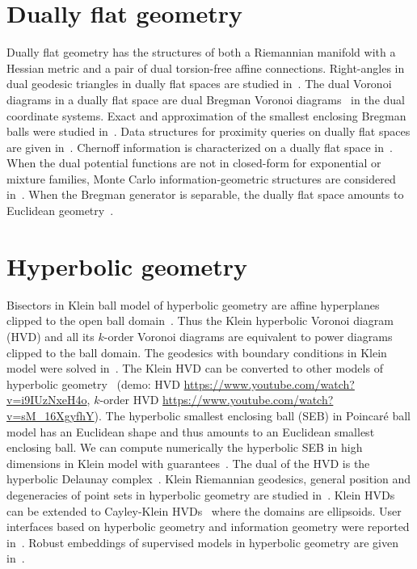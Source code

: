 \documentclass[11pt]{article}
\begin{document}
\section*{Dually flat geometry}

Dually flat geometry has the structures of both a Riemannian manifold with a Hessian metric and a pair of dual torsion-free affine connections.
Right-angles in dual geodesic triangles in dually flat spaces are studied in~\cite{nielsen2021geodesic}.
The dual Voronoi diagrams in a dually flat space are dual Bregman Voronoi diagrams~\cite{boissonnat2010bregman} in the dual coordinate systems.
Exact and approximation of the smallest enclosing Bregman balls were studied in~\cite{nock2005fitting,nielsen2008smallest}.
Data structures for proximity queries on dually flat spaces are given in~\cite{nielsen2009tailored,nielsen2009bregman}.
Chernoff information is characterized on a dually flat space in~\cite{nielsen2013information,nielsen2013hypothesis}.
When the dual potential functions are not in closed-form for exponential or mixture families, Monte Carlo information-geometric structures are considered in~\cite{nielsen2019monte}.
When the Bregman generator is separable, the dually flat space amounts to Euclidean geometry~\cite{gomes2018geometry}.





\section*{Hyperbolic geometry}
Bisectors in Klein ball model of hyperbolic geometry are affine hyperplanes clipped to the open ball domain~\cite{nielsen2010hyperbolic}.
Thus the Klein hyperbolic Voronoi diagram (HVD) and all its $k$-order Voronoi diagrams are equivalent to  power diagrams clipped to the ball domain.
The geodesics with boundary conditions in Klein model were solved in~\cite{nielsen2012hyperbolic}.
The Klein HVD can be converted to other models of hyperbolic geometry~\cite{nielsen2014visualizing} (demo: HVD \url{https://www.youtube.com/watch?v=i9IUzNxeH4o}, $k$-order HVD \url{https://www.youtube.com/watch?v=sM_16XgyfhY}). 
The hyperbolic smallest enclosing  ball (SEB) in Poincar\'e ball model has an Euclidean shape and thus amounts to an Euclidean smallest enclosing ball.
We can compute numerically the hyperbolic SEB in high dimensions in Klein model with guarantees~\cite{nielsen2015approximating}.
The dual of the HVD is the hyperbolic Delaunay complex~\cite{nielsen2020voronoi}. 
Klein Riemannian geodesics, general position and degeneracies of point sets in hyperbolic geometry are studied in~\cite{nielsen2014further}.
Klein HVDs can be extended to Cayley-Klein HVDs~\cite{nielsen2016classification} where the domains are ellipsoids.
User interfaces based on hyperbolic geometry and information geometry were reported in~\cite{nock2013information}.
Robust embeddings of supervised models in hyperbolic geometry are given in~\cite{neurips-2024}.
\end{document}
